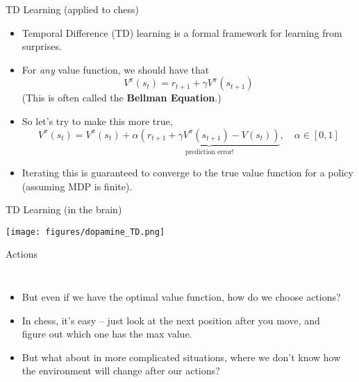 \documentclass{beamer}
\begin{document}
\begin{frame}{TD Learning (applied to chess)}
\begin{itemize}
    \item<1-> Temporal Difference (TD) learning is a formal framework for learning from surprises. 
    \item<2-> For \emph{any} value function, we should have that
        \[V^{\pi}(s_{t}) = r_{t+1} + \gamma V^{\pi}(s_{t+1})\] 
        (This is often called the \textbf{Bellman Equation}.)
    \item<3-> So let's try to make this more true, 
        \[V^{\pi}(s_t) = V^{\pi}(s_t) + \alpha \underbrace{\left( r_{t+1} + \gamma V^{\pi}(s_{t+1}) - V(s_t)\right)}_{\text{prediction error!}}, \quad \alpha \in [0, 1]\]
    \item<4-> Iterating this is guaranteed to converge to the true value function for a policy (assuming MDP is finite).
\end{itemize}
\end{frame}

\begin{frame}{TD Learning (in the brain)}

\begin{center}
\texttt{[image: figures/dopamine\_TD.png]}
\end{center}
\end{frame}

\begin{frame}{Actions}
\begin{columns}
\begin{itemize}
    \item<1-> But even if we have the optimal value function, how do we choose actions? 
    \item<2-> In chess, it's easy -- just look at the next position after you move, and figure out which one has the max value.
    \item<3-> But what about in more complicated situations, where we don't know how the environment will change after our actions?
\end{itemize}
    \begin{center}
    \end{center}
\end{columns}
\end{frame}
\end{document}
